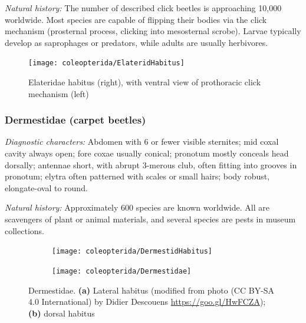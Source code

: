 \noindent{}\textit{Natural history:} The number of described click beetles is approaching 10,000 worldwide. Most species are capable of flipping their bodies via the click mechanism (prosternal process, clicking into mesosternal scrobe). Larvae typically develop as saprophages or predators, while adults are usually herbivores.\vspace{3mm}

\begin{figure}[ht!]
  \centering
    \texttt{[image: coleopterida/ElateridHabitus]}
  \caption{Elateridae habitus (right), with ventral view of prothoracic click mechanism (left) \cite[redrawn from][Plate 18, Fig. 21a; plate 15, Fig. 9a; Plate 12, Fig. 9]{bhlitem14604}}
  \label{fig:elaterids}
\end{figure}

\subsubsection{Dermestidae (carpet beetles)}
\noindent{}\textit{Diagnostic characters:} Abdomen with 6 or fewer visible sternites; mid coxal cavity always open; fore coxae usually conical; pronotum mostly conceals head dorsally; antennae short, with abrupt 3-merous club, often fitting into grooves in pronotum; elytra often patterned with scales or small hairs; body robust, elongate-oval to round.\vspace{3mm}

\noindent{}\textit{Natural history:} Approximately 600 species are known worldwide. All are scavengers of plant or animal materials, and several species are pests in museum collections.

\begin{figure}[ht!]
  \centering
\begin{subfigure}[ht!]{0.4\textwidth}
    \texttt{[image: coleopterida/DermestidHabitus]}
  \caption{}
  \label{fig:dermestid1}
\end{subfigure}
\hfill
\begin{subfigure}[ht!]{0.45\textwidth}
    \texttt{[image: coleopterida/Dermestidae]}
  \caption{}
  \label{fig:dermestid2}\end{subfigure}
    \caption{Dermestidae. \textbf{(a)} Lateral habitus (modified from photo (CC BY-SA 4.0 International) by Didier Descouens \url{https://goo.gl/HwFCZA}); \textbf{(b)} dorsal habitus \citep[redrawn from][Plate 35, Fig. 7]{bhlitem37317beetles}}\label{fig:dermestid}
\end{figure}


